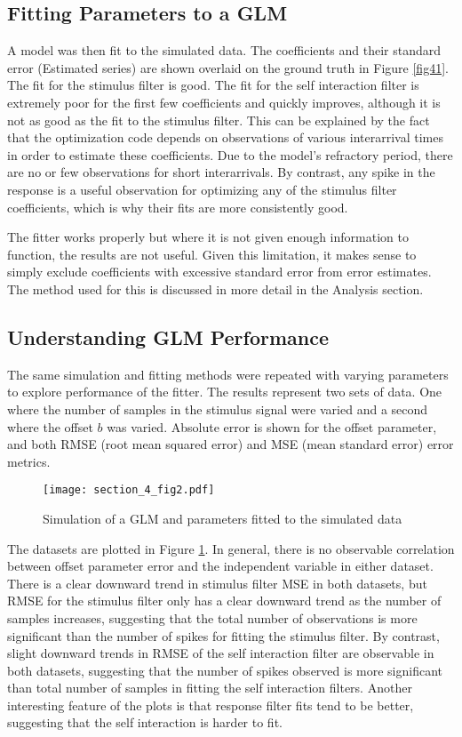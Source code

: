 \documentclass[letterpaper,titlepage,10pt]{article}
\begin{document}
\subsection{Fitting Parameters to a GLM}

A model was then fit to the simulated data. The coefficients and their standard error (Estimated series) are shown
overlaid on the ground truth in Figure \ref{fig41}. The fit for the stimulus filter is good. The fit for the
self interaction filter is extremely poor for the first few coefficients and quickly improves, although it is not as
good as the fit to the stimulus filter. This can be explained by the fact that the optimization code depends on
observations of various interarrival times in order to estimate these coefficients. Due to the model's refractory
period, there are no or few observations for short interarrivals. By contrast, any spike in the response is a useful
observation for optimizing any of the stimulus filter coefficients, which is why their fits are more consistently good.

The fitter works properly but where it is not given enough information to function, the results are not useful. Given
this limitation, it makes sense to simply exclude coefficients with excessive standard error from error estimates. The
method used for this is discussed in more detail in the Analysis section.

\subsection{Understanding GLM Performance}

The same simulation and fitting methods were repeated with varying parameters to explore performance of the fitter.
The results represent two sets of data. One where the number of samples in the stimulus signal were varied and a
second where the offset $b$ was varied. Absolute error is shown for the offset parameter, and both RMSE (root mean
squared error) and MSE (mean standard error) error metrics.

\begin{figure}[H]
\texttt{[image: section\_4\_fig2.pdf]}
\caption{Simulation of a GLM and parameters fitted to the simulated data}
\label{fig42}
\end{figure}

The datasets are plotted in Figure \ref{fig42}. In general, there is no observable correlation between offset parameter
error and the independent variable in either dataset. There is a clear downward trend in stimulus filter MSE in both
datasets, but RMSE for the stimulus filter only has a clear downward trend as the number of samples increases,
suggesting that the total number of observations is more significant than the number of spikes for fitting the stimulus
filter. By contrast, slight downward trends in RMSE of the self interaction filter are observable in both datasets,
suggesting that the number of spikes observed is more significant than total number of samples in fitting the self
interaction filters. Another interesting feature of the plots is that response filter fits tend to be better,
suggesting that the self interaction is harder to fit.
\end{document}
